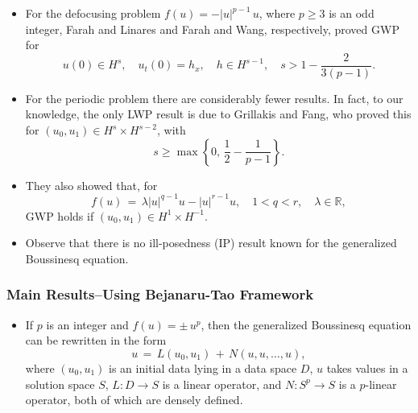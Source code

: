 \documentclass{beamer}
\numberwithin{equation}{section}
\begin{document}
\begin{frame}
  \begin{itemize}
\item For the defocusing problem $f(u)= -|u|^{p-1}\,u$, where $p\geq 3$ is an odd integer, Farah and Linares and Farah and Wang, respectively, proved GWP for 
\[
u(0)\in H^s, \quad u_t(0)=h_x , \quad h \in H^{s-1}, \quad s> 1-\frac{2}{3(p-1)}.
\]
\pause 
\item For the periodic problem there are considerably fewer results. In fact, to our knowledge, the only LWP result is due to Grillakis and Fang, who proved this for $(u_0,u_1)\in H^s \times H^{s-2}$,  with 
\[
s\geq \max \left\{0,\,\frac{1}{2}-\frac{1}{p-1}\right\}. \]
\pause
\item They also showed that, for
\[
f(u)\,=\,\lambda |u|^{q-1}u - |u|^{r-1}u, \quad 1<q<r, \quad \lambda\in \mathbb{R},\] 
GWP holds if $(u_0,u_1)\in H^1\times H^{-1}$. 
\end{itemize}
\end{frame}
\begin{frame}
  \begin{itemize}
\item Observe that there is no ill-posedness (IP) result known for the generalized Boussinesq equation. 
\end{itemize}
\end{frame}
\begin{frame}
  \frametitle{Main Results--Using Bejanaru-Tao Framework}
  \begin{itemize}
    \item If $p$ is an integer and $f(u)=\pm\, u^p$, then the generalized Boussinesq equation can be rewritten in the form 
\begin{equation*}
u\,=\,L(u_0,u_1)\,+\,N(u,u, \ldots, u),
\label{LN}
\end{equation*}
where $(u_0, u_1)$ is an initial data lying in a data space $D$, $u$ takes values in a solution space $S$, $L: D \to S$ is a linear operator, and $N:S^{p} \to S$ is a $p$-linear operator, both of which are densely defined.  

\end{itemize}
\end{frame}
\end{document}
